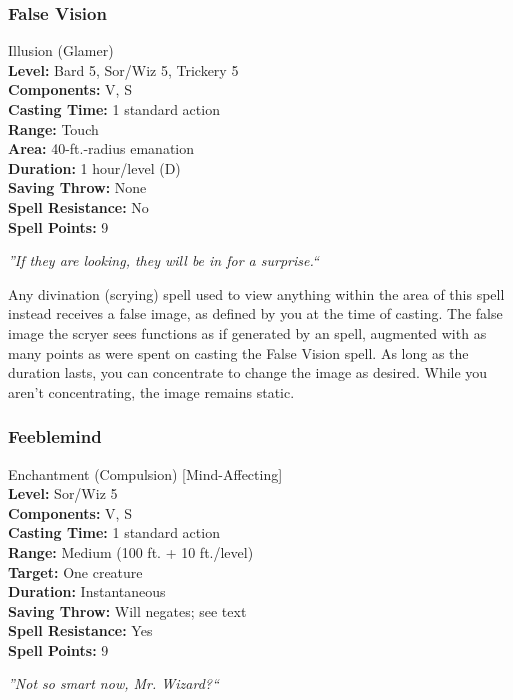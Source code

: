 \subsubsection{False Vision}
\label{Spell:FalseVision}
Illusion (Glamer)
\\ \textbf{Level:} Bard 5, Sor/Wiz 5, Trickery 5
\\ \textbf{Components:} V, S
\\ \textbf{Casting Time:} 1 standard action
\\ \textbf{Range:} Touch
\\ \textbf{Area:} 40-ft.-radius emanation
\\ \textbf{Duration:} 1 hour/level (D)
\\ \textbf{Saving Throw:} None
\\ \textbf{Spell Resistance:} No
\\ \textbf{Spell Points:} 9

\emph{''If they are looking, they will be in for a surprise.``}

Any divination (scrying) spell used to view anything within the area of this spell instead receives a false image, as defined by you at the time of casting. 
The false image the scryer sees functions as if generated by an  spell, augmented with as many points as were spent on casting the
False Vision spell.
As long as the duration lasts, you can concentrate to change the image as desired. 
While you aren't concentrating, the image remains static.
\subsubsection{Feeblemind}
\label{Spell:Feeblemind}
Enchantment (Compulsion) [Mind-Affecting]
\\ \textbf{Level:} Sor/Wiz 5
\\ \textbf{Components:} V, S
\\ \textbf{Casting Time:} 1 standard action
\\ \textbf{Range:} Medium (100 ft. + 10 ft./level)
\\ \textbf{Target:} One creature
\\ \textbf{Duration:} Instantaneous
\\ \textbf{Saving Throw:} Will negates; see text
\\ \textbf{Spell Resistance:} Yes
\\ \textbf{Spell Points:} 9

\emph{''Not so smart now, Mr. Wizard?``}

